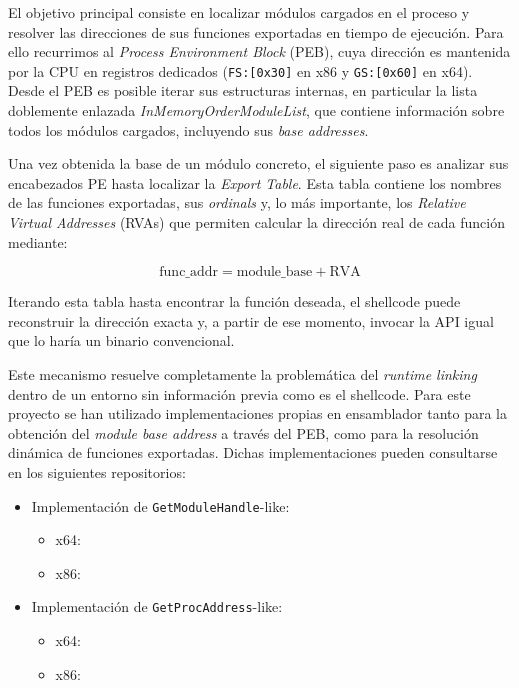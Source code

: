 El objetivo principal consiste en localizar módulos cargados en el proceso y resolver las direcciones de sus funciones exportadas en tiempo de ejecución. Para ello recurrimos al \textit{Process Environment Block} (PEB), cuya dirección es mantenida por la CPU en registros dedicados (\texttt{FS:[0x30]} en x86 y \texttt{GS:[0x60]} en x64). Desde el PEB es posible iterar sus estructuras internas, en particular la lista doblemente enlazada \textit{InMemoryOrderModuleList}, que contiene información sobre todos los módulos cargados, incluyendo sus \textit{base addresses}.

Una vez obtenida la base de un módulo concreto, el siguiente paso es analizar sus encabezados PE hasta localizar la \textit{Export Table}. Esta tabla contiene los nombres de las funciones exportadas, sus \textit{ordinals} y, lo más importante, los \textit{Relative Virtual Addresses} (RVAs) que permiten calcular la dirección real de cada función mediante:

\[
\text{func\_addr} = \text{module\_base} + \text{RVA}
\]

Iterando esta tabla hasta encontrar la función deseada, el shellcode puede reconstruir la dirección exacta y, a partir de ese momento, invocar la API igual que lo haría un binario convencional.

Este mecanismo resuelve completamente la problemática del \textit{runtime linking} dentro de un entorno sin información previa como es el shellcode. Para este proyecto se han utilizado implementaciones propias en ensamblador tanto para la obtención del \textit{module base address} a través del PEB, como para la resolución dinámica de funciones exportadas. Dichas implementaciones pueden consultarse en los siguientes repositorios:

\begin{itemize}
    \item Implementación de \texttt{GetModuleHandle}-like:
    \begin{itemize}
        \item x64: \cite{x64_get_module}
        \item x86: \cite{x86_get_module}
    \end{itemize}
    \item Implementación de \texttt{GetProcAddress}-like:
    \begin{itemize}
        \item x64: \cite{x64_get_proc}
        \item x86: \cite{x86_get_proc}
    \end{itemize}
\end{itemize}

